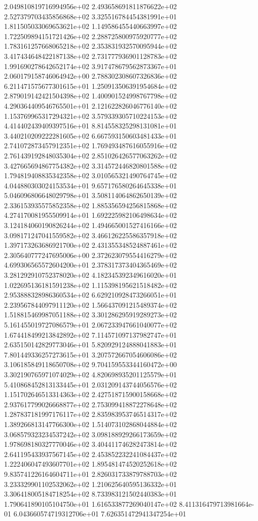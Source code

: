 2.049810819716994956e+02 2.493658691811876622e+02 2.527379703435856868e+02
3.325516784454381991e+01 1.811505033069653621e+02 1.149586455440663997e+02
1.722509894151721426e+02 2.288725800975920777e+02 1.783161257668065218e+02
2.353831932570095944e+02 3.417434648422187138e+02 2.731777936901128783e+02
1.991690278642652174e+02 3.917478679562873367e+01 2.060179158746064942e+00
2.788302308607326836e+02 6.211471575677301615e+01 1.250913506391954684e+02
2.879019142421504398e+02 1.400901524998767798e+02 4.290364409546765501e+01
2.121622826046776140e+02 1.153769965317294321e+02 3.579339305710224153e+02
4.414402439409397516e+01 8.814558325298131081e+01 3.440210209222281605e+02
6.667593150603481433e+01 2.741072873457912351e+02 1.769493487616055916e+02
2.761439192848035304e+02 2.851026426577063262e+02 3.427665694867754382e+02
3.314572446820801588e+02 1.794819408835342358e+02 3.010565321490764745e+02
4.044880303024153534e+01 9.657176580264645338e+01 5.046096806648029798e+01
3.508114064862650139e+02 2.336153935575852358e+02 1.885356594256815868e+02
4.274170081955509914e+01 1.692225982106498634e+02 3.124184060190826244e+02
1.494665001527416166e+02 3.098171247041559582e+02 3.466126225586357918e+02
1.397173263686921700e+02 2.431355348524887461e+02 2.305640777247695006e+00
2.372623079554416279e+02 4.699306565572604200e+01 2.378317373404365469e+02
3.281292910752378020e+02 4.182345392349616020e+01 1.022695136181591238e+02
1.115398195621518482e+02 2.953888328986360534e+02 6.629210928473266051e+01
2.239567844097911120e+02 1.566437091215489374e+02 1.518815469987051188e+02
3.301286295919289273e+02 5.161455019727086579e+01 2.067233947661040077e+02
1.674418499213842892e+02 7.114571097137982747e+01 2.635150142829773046e+01
5.820929124888041883e+01 7.801449336257273615e+01 3.207572667054606086e+02
3.106185849118650708e+02 9.704159553344160472e+00 3.302190765971074029e+02
4.820698935201125579e+01 5.410868452813133445e+01 2.031209143744056576e+02
1.151702646513314363e+02 2.427518715900158668e+02 2.937617799026668877e+02
2.753099418872278648e+02 1.287837181997176117e+02 2.835983953746514317e+02
1.389266813147766300e+02 1.514073102868044884e+02 3.068579323234537242e+02
3.098188929266173659e+02 1.978698180327770046e+02 3.404411746282473814e+02
2.641195433937567145e+02 2.453852232241084437e+02 1.222406047493607701e+02
1.895481474520252618e+02 9.835741226164604711e+01 2.826031733879788703e+02
3.233329901102532062e+02 1.210625640595136332e+01 3.306418005184718254e+02
8.733983121502440383e+01 1.790641890105104750e+01 1.616533877269040147e+02
8.411316479713981664e-01 6.043660574719312706e+01 7.626351472941347254e+01
